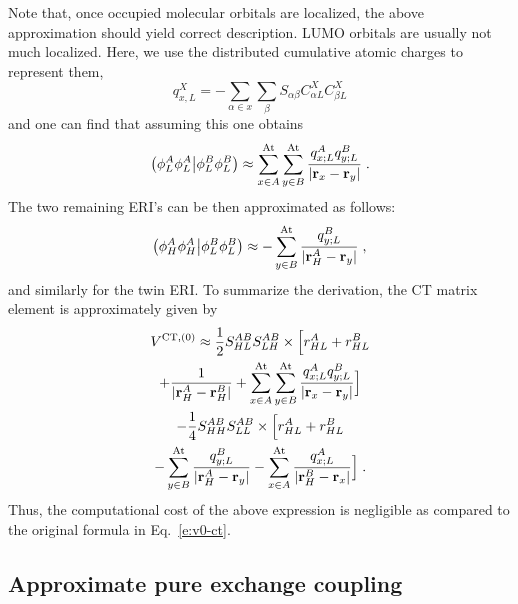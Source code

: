 %
Note that, once occupied molecular orbitals are localized, the above approximation
should yield correct description. LUMO orbitals are usually not much localized.
Here, we use the distributed cumulative atomic charges to represent them, %
%
\begin{equation} 
 q^X_{x,L} =-\sum_{\alpha\in x} \sum_\beta S_{\alpha\beta} C_{\alpha L}^X C_{\beta L}^X
\end{equation}
%
and one can find that assuming this one obtains
%
\begin{equation} 
 \bigl( {\phi_L^A \phi_L^A} \bigl\lvert {\phi_L^B \phi_L^B} \bigr) 
 \approx \sum_{x\in A}^{\rm At} \sum_{y\in B}^{\rm At}
 \frac{q_{x;L}^A q_{y;L}^B}{\vert {\bf r}_x - {\bf r}_y \vert} \;.
\end{equation}
%
The two remaining ERI's can be then approximated as follows:
%
\begin{equation} 
 \bigl( {\phi_H^A \phi_H^A} \bigl\lvert {\phi_L^B \phi_L^B} \bigr) 
 \approx -\sum_{y\in B}^{\rm At}
 \frac{q_{y;L}^B}{\vert {\bf r}_H^A - {\bf r}_y \vert} \;,
\end{equation}
%
and similarly for the twin ERI. To summarize the derivation, the CT matrix element
is approximately given by
%
\begin{multline}\label{e:v0-ct.mulliken.working}
 V^{{\rm CT },(0)} \approx \frac{1}{2} S_{HL}^{AB} S_{LH}^{AB} \times 
  \Big[ r_{HL}^A + r_{HL}^B \\ 
 + \frac{1}{\vert {\bf r}_H^A - {\bf r}_H^B \vert} 
 + \sum_{x\in A}^{\rm At} \sum_{y\in B}^{\rm At} 
 \frac{q_{x;L}^A q_{y;L}^B}{\vert {\bf r}_x - {\bf r}_y \vert} \Big] \\
 -\frac{1}{4} S_{HH}^{AB} S_{LL}^{AB} \times 
  \Big[ r_{HL}^A + r_{HL}^B \\
 -\sum_{y\in B}^{\rm At}
 \frac{q_{y;L}^B}{\vert {\bf r}_H^A - {\bf r}_y \vert} 
 -\sum_{x\in A}^{\rm At}
 \frac{q_{x;L}^A}{\vert {\bf r}_H^B - {\bf r}_x \vert} \Big]\;.
\end{multline}
%
Thus, the computational cost of the above expression is negligible as
compared to the original formula in Eq.~\eqref{e:v0-ct}.

\subsection{\label{s:2.3}Approximate pure exchange coupling}

